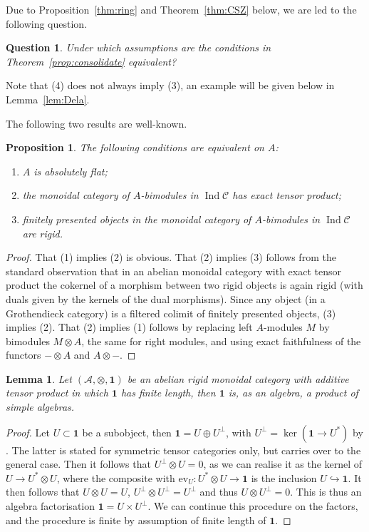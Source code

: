 \documentclass[11pt]{amsart}
\def\ker{\operatorname{ker}}
\def\Ind{\operatorname{Ind}}
\def\cA{\mathscr{A}}
\def\cC{\mathscr{C}}
\newtheorem{lemma}[thm]{Lemma}
\newtheorem{prop}[thm]{Proposition}
\newtheorem{question}[thm]{Question}
\theoremstyle{definition}
\theoremstyle{remark}
\numberwithin{equation}{section}
\newcommand{\unit}{\mathbf{1}}
\newcommand{\ev}{\mathrm{ev}}
\begin{document}
Due to Proposition~\ref{thm:ring} and Theorem~\ref{thm:CSZ} below, we are led to the following question.
\begin{question}\label{mainquestion}
    Under which assumptions are the conditions in Theorem~\ref{prop:consolidate} equivalent?
\end{question}
Note that (4) does not always imply (3), an example will be given below in Lemma~\ref{lem:Dela}.

The following two results are well-known.
\begin{prop}\label{prop:absflattensor}
    The following conditions are equivalent on $A$:
    \begin{enumerate}
        \item $A$ is absolutely flat;
        \item the monoidal category of $A$-bimodules in $\Ind\cC$ has exact tensor product;
        \item finitely presented objects in the monoidal category of $A$-bimodules in $\Ind\cC$ are rigid.
    \end{enumerate}
\end{prop}
\begin{proof}
    That (1) implies (2) is obvious. That (2) implies (3) follows from the standard observation that in an abelian monoidal category with exact tensor product the cokernel of a morphism between two rigid objects is again rigid (with duals given by the kernels of the dual morphisms). Since any object (in a Grothendieck category) is a filtered colimit of finitely presented objects, (3) implies (2). That (2) implies (1) follows by  replacing left $A$-modules $M$ by bimodules $M\otimes A$, the same for right modules, and using exact faithfulness of the functors $-\otimes A$ and $A\otimes-$.
\end{proof}

\begin{lemma}\label{Lem:DM}
    Let $(\cA,\otimes,\unit)$ be an abelian rigid monoidal category with additive tensor product in which $\unit$ has finite length, then $\unit$ is, as an algebra, a product of simple algebras.
\end{lemma}
\begin{proof}
    Let $U\subset\unit$ be a subobject, then $\unit=U\oplus U^\perp$, with $U^\perp=\ker(\unit\to U^\ast)$ by \cite[Proposition~1.17]{DM}. The latter is stated for symmetric tensor categories only, but carries over to the general case. Then it follows that $U^\perp\otimes U=0$, as we can realise it as the kernel of $U\to U^\ast\otimes U$, where the composite with $\ev_U:U^\ast\otimes U\to\unit$ is the inclusion $U\hookrightarrow \unit$. It then follows that $U\otimes U=U$, $U^\perp\otimes U^\perp=U^\perp$ and thus $U\otimes U^\perp=0$. This is thus an algebra factorisation $\unit=U\times U^\perp$. We can continue this procedure on the factors, and the procedure is finite by assumption of finite length of $\unit$.
\end{proof}
\end{document}
